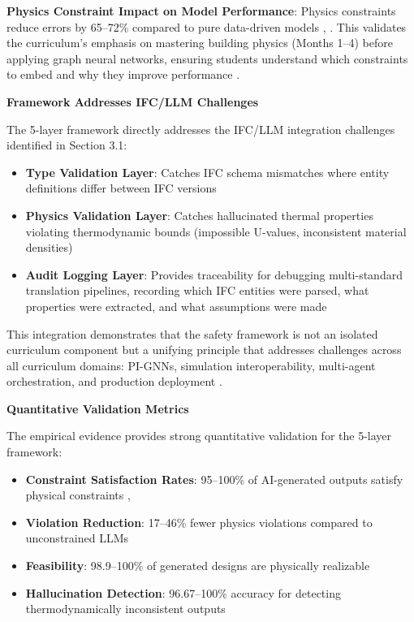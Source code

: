 \documentclass[12pt,a4paper]{article}
\begin{document}
\textbf{Physics Constraint Impact on Model Performance}: Physics constraints reduce errors by 65--72\% compared to pure data-driven models \cite{ref210}, \cite{ref211}. This validates the curriculum's emphasis on mastering building physics (Months 1--4) before applying graph neural networks, ensuring students understand which constraints to embed and why they improve performance \cite{ref212}.

\textbf{Framework Addresses IFC/LLM Challenges}

The 5-layer framework directly addresses the IFC/LLM integration challenges identified in Section 3.1:

\begin{itemize}
  \item \textbf{Type Validation Layer}: Catches IFC schema mismatches where entity definitions differ between IFC versions \cite{ref213}
  \item \textbf{Physics Validation Layer}: Catches hallucinated thermal properties violating thermodynamic bounds (impossible U-values, inconsistent material densities) \cite{ref214}
  \item \textbf{Audit Logging Layer}: Provides traceability for debugging multi-standard translation pipelines, recording which IFC entities were parsed, what properties were extracted, and what assumptions were made \cite{ref215}
\end{itemize}

This integration demonstrates that the safety framework is not an isolated curriculum component but a unifying principle that addresses challenges across all curriculum domains: PI-GNNs, simulation interoperability, multi-agent orchestration, and production deployment \cite{ref216}.

\textbf{Quantitative Validation Metrics}

The empirical evidence provides strong quantitative validation for the 5-layer framework:

\begin{itemize}
  \item \textbf{Constraint Satisfaction Rates}: 95--100\% of AI-generated outputs satisfy physical constraints \cite{ref217}, \cite{ref218}
  \item \textbf{Violation Reduction}: 17--46\% fewer physics violations compared to unconstrained LLMs \cite{ref219}
  \item \textbf{Feasibility}: 98.9--100\% of generated designs are physically realizable \cite{ref220}
  \item \textbf{Hallucination Detection}: 96.67--100\% accuracy for detecting thermodynamically inconsistent outputs \cite{ref221}
\end{itemize}
\end{document}
